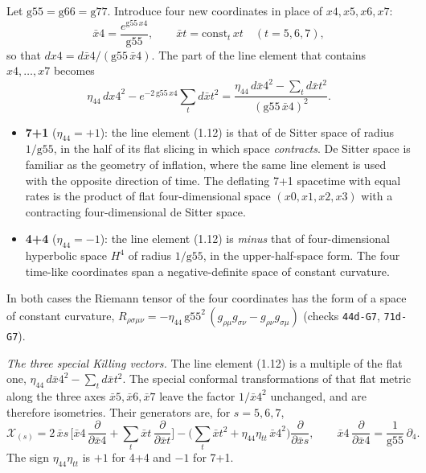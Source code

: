 \documentclass[
  10pt,
]{article}
\providecommand{\tightlist}{%
  \setlength{\itemsep}{0pt}\setlength{\parskip}{0pt}}
\begin{document}
Let \(\mathrm{g55}=\mathrm{g66}=\mathrm{g77}\). Introduce four new
coordinates in place of \(x4,x5,x6,x7\):
\[\bar x4=\frac{e^{\mathrm{g55}\,x4}}{\mathrm{g55}},\qquad\bar xt=\mathrm{const}_t\,xt\quad(t=5,6,7),\]
so that \(dx4=d\bar x4/(\mathrm{g55}\,\bar x4)\). The part of the line
element that contains \(x4,\dots,x7\) becomes
\[\eta_{44}\,dx4^2-e^{-2\,\mathrm{g55}\,x4}\sum_t d\bar xt^2
=\frac{\eta_{44}\,d\bar x4^2-\sum_t d\bar xt^2}{(\mathrm{g55}\,\bar x4)^2} .\tag{1.12}\]

\begin{itemize}
\tightlist
\item
  \textbf{7+1} (\(\eta_{44}=+1\)): the line element (1.12) is that of de
  Sitter space of radius \(1/\mathrm{g55}\), in the half of its flat
  slicing in which space \emph{contracts}. De Sitter space is familiar
  as the geometry of inflation, where the same line element is used with
  the opposite direction of time. The deflating 7+1 spacetime with equal
  rates is the product of flat four-dimensional space \((x0,x1,x2,x3)\)
  with a contracting four-dimensional de Sitter space.
\item
  \textbf{4+4} (\(\eta_{44}=-1\)): the line element (1.12) is
  \emph{minus} that of four-dimensional hyperbolic space \(H^4\) of
  radius \(1/\mathrm{g55}\), in the upper-half-space form. The four
  time-like coordinates span a negative-definite space of constant
  curvature.
\end{itemize}

In both cases the Riemann tensor of the four coordinates has the form of
a space of constant curvature,
\(R_{\rho\sigma\mu\nu}=-\eta_{44}\,\mathrm{g55}^2\,(g_{\rho\mu}g_{\sigma\nu}-g_{\rho\nu}g_{\sigma\mu})\)
(checks \texttt{44d-G7}, \texttt{71d-G7}).

\emph{The three special Killing vectors.} The line element (1.12) is a
multiple of the flat one, \(\eta_{44}\,d\bar x4^2-\sum_td\bar xt^2\).
The special conformal transformations of that flat metric along the
three axes \(\bar x5,\bar x6,\bar x7\) leave the factor \(1/\bar x4^2\)
unchanged, and are therefore isometries. Their generators are, for
\(s=5,6,7\),
\[\mathcal X_{(s)}=2\,\bar xs\,\Big[\bar x4\,\frac{\partial}{\partial\bar x4}+\sum_t\bar xt\,\frac{\partial}{\partial\bar xt}\Big]
-\Big(\sum_t\bar xt^2+\eta_{44}\eta_{tt}\,\bar x4^2\Big)\frac{\partial}{\partial\bar xs},\qquad
\bar x4\,\frac{\partial}{\partial\bar x4}=\frac1{\mathrm{g55}}\,\partial_4 .\tag{1.13}\]
The sign \(\eta_{44}\eta_{tt}\) is \(+1\) for 4+4 and \(-1\) for 7+1.
\end{document}
